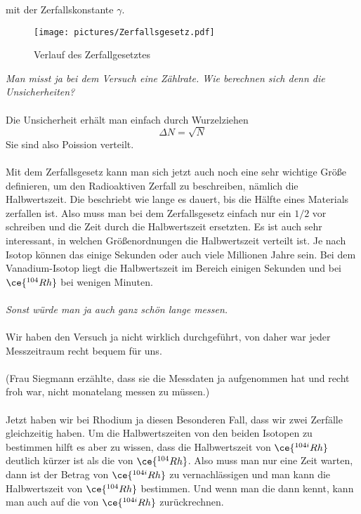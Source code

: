 mit der Zerfallskonstante $\gamma$.
\begin{figure}[H]
    \centering
    \texttt{[image: pictures/Zerfallsgesetz.pdf]}
    \caption{Verlauf des Zerfallgesetztes}
    \label{fig:Zerfall}
  \end{figure}
\noindent
\textit{Man misst ja bei dem Versuch eine Zählrate. Wie berechnen sich denn die Unsicherheiten?}
\\\\\noindent
Die Unsicherheit erhält man einfach durch Wurzelziehen
\begin{equation}
    \Delta N=\sqrt{N}
\end{equation}
Sie sind also Poission verteilt.
\\\\\noindent
Mit dem Zerfallsgesetz kann man sich jetzt auch noch eine sehr wichtige Größe definieren, um den Radioaktiven Zerfall zu beschreiben, nämlich
die Halbwertszeit. Die beschriebt wie lange es dauert, bis die Hälfte eines Materials zerfallen ist. Also muss man bei dem Zerfallsgesetz 
einfach nur ein $1/2$ vor schreiben und die Zeit durch die Halbwertszeit ersetzten. Es ist auch sehr interessant, in welchen Größenordnungen 
die Halbwertszeit verteilt ist. Je nach Isotop können das einige Sekunden oder auch viele Millionen Jahre sein. Bei dem Vanadium-Isotop liegt
die Halbwertszeit im Bereich einigen Sekunden und bei $\ce{^{104}Rh}$ bei wenigen Minuten.
\\\\\noindent
\textit{Sonst würde man ja auch ganz schön lange messen.}
\\\\\noindent
Wir haben den Versuch ja nicht wirklich durchgeführt, von daher war jeder Messzeitraum recht bequem für uns.
\\\\\noindent
(Frau Siegmann erzählte, dass sie die Messdaten ja aufgenommen hat und recht froh war, nicht monatelang messen zu müssen.)
\\\\\noindent
Jetzt haben wir bei Rhodium ja diesen Besonderen Fall, dass wir zwei Zerfälle gleichzeitig haben. Um die Halbwertszeiten von den beiden 
Isotopen zu bestimmen hilft es aber zu wissen, dass die Halbwertszeit von $\ce{^{104i}Rh}$ deutlich kürzer ist als die von 
$\ce{^{104}Rh}$. Also muss man nur eine Zeit warten, dann ist der Betrag von $\ce{^{104i}Rh}$ zu vernachlässigen und man kann die 
Halbwertszeit von $\ce{^{104}Rh}$ bestimmen. Und wenn man die dann kennt, kann man auch auf die von $\ce{^{104i}Rh}$ zurückrechnen. 
